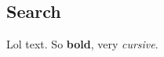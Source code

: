 \documentclass[Main]{subfiles}
\begin{document}
\subsection{Search} %
	\label{sec:search}

	Lol text.
	So \textbf{bold}, very \emph{cursive}.

\end{document}
